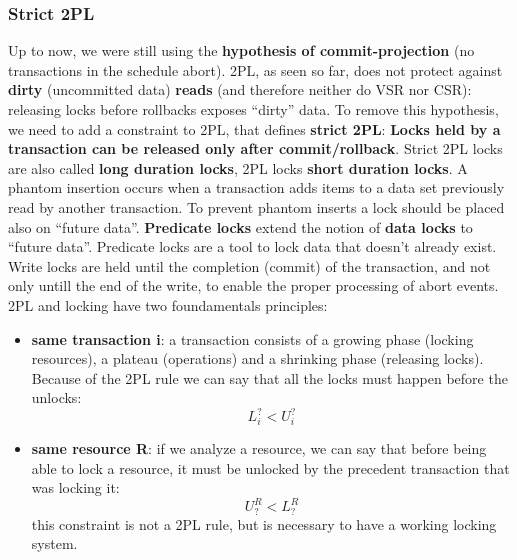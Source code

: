 \subsubsection{Strict 2PL}
Up to now, we were still using the \textbf{hypothesis of
commit-projection} (no transactions in the schedule
abort).\newline
2PL, as seen so far, does not protect against \textbf{dirty} (uncommitted data) \textbf{reads} (and therefore neither do VSR nor CSR): releasing locks before rollbacks exposes “dirty” data.\newline
\newline
To remove this hypothesis, we need to add a constraint to
2PL, that defines \textbf{strict 2PL}: \textbf{Locks held by a transaction can be released only after
commit/rollback}.\newline
\newline
Strict 2PL locks are also called \textbf{long duration locks}, 2PL locks \textbf{short duration locks}.\newline
\newline
A phantom insertion occurs when a transaction adds items to a data set previously read by another transaction. To prevent phantom inserts a lock should be placed also on
“future data”.\newline
\newline
\textbf{Predicate locks} extend the notion of \textbf{data locks} to “future data”. Predicate locks are a tool to lock data that doesn't already exist.\newline
\newline
Write locks are held until the completion (commit) of the transaction, and not only untill the end of the write, to enable the proper processing of abort events.\newline
\newline
\newline
2PL and locking have two foundamentals principles:
\begin{itemize}
    \item \textbf{same transaction i}: a transaction consists of a growing phase (locking resources), a plateau (operations) and a shrinking phase (releasing locks). Because of the 2PL rule we can say that all the locks must happen before the unlocks:
    \[
        L^?_i < U^?_i
    \]
    \item \textbf{same resource R}: if we analyze a resource, we can say that before being able to lock a resource, it must be unlocked by the precedent transaction that was locking it:
    \[
        U^R_? < L^R_?
    \]
    this constraint is not a 2PL rule, but is necessary to have a working locking system.
\end{itemize}
